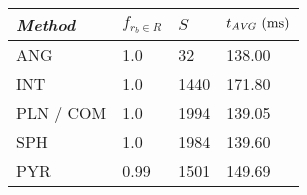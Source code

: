 
\begin{tabular}{m{}|m{}|m{}|m{}}
    \toprule
    \textit{Method} & $f_{r_b \in R}$ & $S$ & $t_{\AVG} \ (\si{ms})$  \\ \hline
    ANG & \num{1.0} & \num{32} & \num{138.00} \\ \hline
    INT & \num{1.0} & \num{1440} & \num{171.80} \\ \hline
    PLN / COM & \num{1.0} & \num{1994} & \num{139.05} \\ \hline
    SPH & \num{1.0} & \num{1984} & \num{139.60} \\ \hline
    PYR & \num{0.99} & \num{1501} & \num{149.69} \\ \bottomrule
\end{tabular}